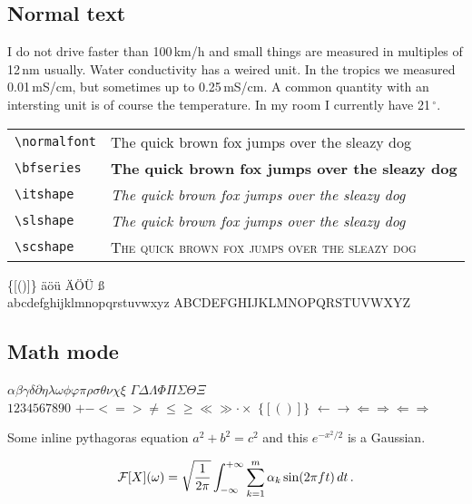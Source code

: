 \subsection{Normal text}

I do not drive faster than 100\,km/h and small things are measured in
multiples of 12\,nm usually. Water conductivity has a weired unit. In
the tropics we measured 0.01\,mS/cm, but sometimes up to
0.25\,mS/cm. A common quantity with an intersting unit is of course
the temperature. In my room I currently have 21\,$^{\circ}$.

\bigskip
\noindent
\begin{tabular}{@{}ll}
  \texttt{\textbackslash normalfont} & The quick brown fox jumps over the sleazy dog \\
  \texttt{\textbackslash bfseries} & \textbf{The quick brown fox jumps over the sleazy dog} \\
  \texttt{\textbackslash itshape} & \textit{The quick brown fox jumps over the sleazy dog} \\
  \texttt{\textbackslash slshape} & \textsl{The quick brown fox jumps over the sleazy dog} \\
  \texttt{\textbackslash scshape} & \textsc{The quick brown fox jumps over the sleazy dog}
\end{tabular}

\bigskip
{} \qquad \{[()]\} \qquad \"a\"o\"u  \"A\"O\"U {\ss} \\
abcdefghijklmnopqrstuvwxyz \qquad ABCDEFGHIJKLMNOPQRSTUVWXYZ

\subsection{Math mode}

$\alpha\beta\gamma\delta\partial\eta\lambda\omega\phi\varphi\pi\rho\sigma\theta\nu\chi\xi$ \qquad $\Gamma\Delta\Lambda\Phi\Pi\Sigma\Theta\Xi$\\
$1234567890$
\qquad $+ - <=> \ne \le \ge \ll \gg \cdot \times$
\qquad $\{[()]\}$
\qquad $\leftarrow \rightarrow \Leftarrow \Rightarrow \Longleftarrow \Longrightarrow$

\bigskip
\noindent
Some inline pythagoras equation $a^2 + b^2 = c^2$ and this $e^{-x^2/2}$ is a Gaussian.

\[ {\cal F}[X](\omega) = \sqrt{\frac{1}{2\pi}}\int_{-\infty}^{+\infty} \sum_{k=1}^m \alpha_k\sin(2\pi f t)\,dt\,. \]

